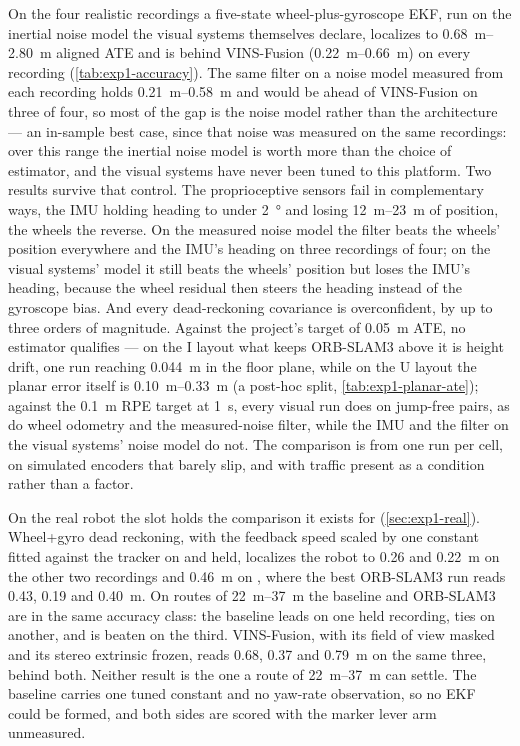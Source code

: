 On the four realistic recordings a five-state wheel-plus-gyroscope EKF, run on
the inertial noise model the visual systems themselves declare, localizes to
\SIrange{0.68}{2.80}{\metre} aligned ATE and is behind VINS-Fusion
(\SIrange{0.22}{0.66}{\metre}) on every recording
(\cref{tab:exp1-accuracy}). The same filter on a noise model measured from
each recording holds \SIrange{0.21}{0.58}{\metre} and would be ahead of
VINS-Fusion on three of four, so most of the gap is the noise model rather
than the architecture --- an in-sample best case, since that noise was measured
on the same recordings: over this range the inertial noise model is worth
more than the choice of estimator, and the visual systems have never been
tuned to this platform. Two results survive that control. The proprioceptive
sensors fail in complementary ways, the IMU holding heading to under
\SI{2}{\degree} and losing \SIrange{12}{23}{\metre} of position, the wheels
the reverse. On the measured noise model the filter beats the wheels'
position everywhere and the IMU's heading on three recordings of four; on the
visual systems' model it still beats the wheels' position but loses the IMU's
heading, because the wheel residual then steers the heading instead of the
gyroscope bias. And every dead-reckoning
covariance is overconfident, by up to three orders of magnitude. Against the
project's target of \SI{0.05}{\metre} ATE, no estimator qualifies --- on the I
layout what keeps ORB-SLAM3 above it is height drift, one run reaching
\SI{0.044}{\metre} in the floor plane, while on the U layout the planar error
itself is \SIrange{0.10}{0.33}{\metre} (a post-hoc split,
\cref{tab:exp1-planar-ate}); against the
\SI{0.1}{\metre} RPE target at \SI{1}{\second}, every visual run does on
jump-free pairs, as do wheel odometry and the measured-noise filter, while the
IMU and the filter on the visual systems' noise model do not. The
comparison is from one run per cell, on simulated encoders that barely slip,
and with traffic present as a condition rather than a factor.

On the real robot the slot holds the comparison it exists for
(\cref{sec:exp1-real}). Wheel+gyro dead reckoning, with the feedback speed
scaled by one constant fitted against the tracker on  and
held, localizes the robot to \SI{0.26}{} and \SI{0.22}{\metre} on the other
two  recordings and \SI{0.46}{\metre} on , where
the best ORB-SLAM3 run reads \SI{0.43}{}, \SI{0.19}{} and \SI{0.40}{\metre}.
On routes of \SIrange{22}{37}{\metre} the baseline and ORB-SLAM3 are in the
same accuracy class: the baseline leads on one held recording, ties on
another, and is beaten on the third. VINS-Fusion, with its field of view masked
and its stereo extrinsic frozen, reads \SI{0.68}{}, \SI{0.37}{} and
\SI{0.79}{\metre} on the same three, behind both. Neither result is the one a
route of \SIrange{22}{37}{\metre} can settle. The baseline carries one tuned constant and no yaw-rate observation,
so no EKF could be formed, and both sides are scored with the marker lever arm
unmeasured.

